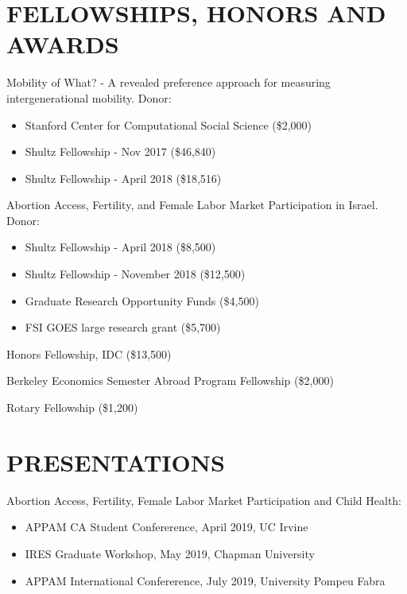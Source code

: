 \documentclass[margin]{res} %
\begin{document}
\begin{resume}
\section{FELLOWSHIPS, HONORS AND AWARDS}

Mobility of What? - A revealed preference approach for measuring intergenerational mobility.
Donor: 
\begin{itemize}
	\item Stanford Center for Computational Social Science (\$2,000) 
	\item Shultz Fellowship - Nov 2017 (\$46,840)
    \item Shultz Fellowship - April 2018 (\$18,516)
\end{itemize}	

Abortion Access, Fertility, and Female Labor Market Participation in Israel.
Donor: 
\begin{itemize}
    \item Shultz Fellowship - April 2018 (\$8,500)
    \item Shultz Fellowship - November 2018 (\$12,500)
    \item Graduate Research Opportunity Funds (\$4,500)
    \item FSI GOES large research grant (\$5,700)
\end{itemize}	

Honors Fellowship, IDC (\$13,500) 

Berkeley Economics Semester Abroad Program Fellowship (\$2,000) 

Rotary Fellowship (\$1,200) 

 
\section{PRESENTATIONS} 
\vspace{5mm} 
Abortion Access, Fertility, Female Labor Market Participation and Child Health:
\begin{itemize}
	\item APPAM CA Student Confererence, April 2019, UC Irvine
 	\item IRES Graduate Workshop, May 2019, Chapman University
 	\item APPAM International Confererence, July 2019, University Pompeu Fabra
\end{itemize}


\end{resume}
\end{document}
